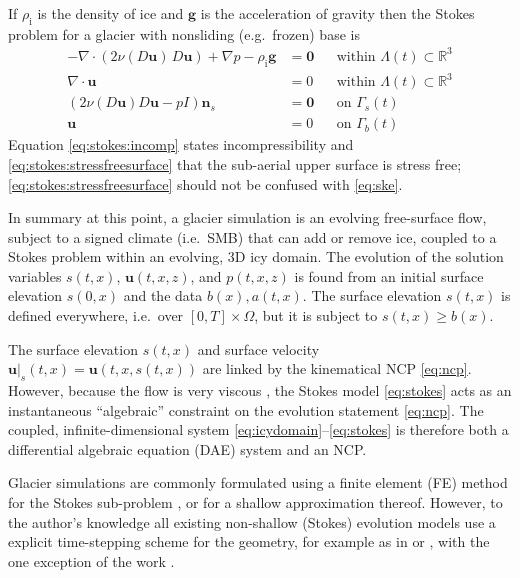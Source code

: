 \documentclass[hidelinks,onefignum,onetabnum,final]{siamart220329}  %
\newcommand{\RR}{\mathbb{R}}
\newcommand{\bg}{\mathbf{g}}
\newcommand{\bn}{\mathbf{n}}
\newcommand{\bu}{\mathbf{u}}
\newcommand{\bzero}{\bm{0}}
\newcommand{\rhoi}{\rho_{\text{i}}}
\begin{document}
If $\rhoi$ is the density of ice and $\bg$ is the acceleration of gravity then the Stokes problem for a glacier with nonsliding (e.g.~frozen) base \cite{JouvetRappaz2011} is
\begin{subequations}
\label{eq:stokes}
\begin{align}
- \nabla \cdot \left(2 \nu(D\bu)\, D\bu\right) + \nabla p - \rhoi \bg &= \bzero && \text{within $\Lambda(t) \subset \RR^3$} \\
\nabla \cdot \bu &= 0 && \text{within $\Lambda(t) \subset \RR^3$} \label{eq:stokes:incomp} \\
\left(2 \nu(D\bu) D\bu - pI\right) \bn_s &= \bzero && \text{on $\Gamma_s(t)$}\label{eq:stokes:stressfreesurface} \\
\bu  &= 0 && \text{on $\Gamma_b(t)$}
\end{align}
\end{subequations}
Equation \eqref{eq:stokes:incomp} states incompressibility and \eqref{eq:stokes:stressfreesurface} that the sub-aerial upper surface is stress free; \eqref{eq:stokes:stressfreesurface} should not be confused with \eqref{eq:ske}.

In summary at this point, a glacier simulation is an evolving free-surface flow, subject to a signed climate (i.e.~SMB) that can add or remove ice, coupled to a Stokes problem within an evolving, 3D icy domain.  The evolution of the solution variables $s(t,x)$, $\bu(t,x,z)$, and $p(t,x,z)$ is found from an initial surface elevation $s(0,x)$ and the data $b(x),a(t,x)$.  The surface elevation $s(t,x)$ is defined everywhere, i.e.~over $[0,T]\times \Omega$, but it is subject to $s(t,x) \ge b(x)$.

The surface elevation $s(t,x)$ and surface velocity $\bu|_s(t,x)=\bu(t,x,s(t,x))$ are linked by the kinematical NCP \eqref{eq:ncp}.  However, because the flow is very viscous \cite{Acheson1990}, the Stokes model \eqref{eq:stokes} acts as an instantaneous ``algebraic'' constraint on the evolution statement \eqref{eq:ncp}.  The coupled, infinite-dimensional system \eqref{eq:icydomain}--\eqref{eq:stokes} is therefore both a differential algebraic equation (DAE) system \cite{AscherPetzold1998} and an NCP.

Glacier simulations are commonly formulated using a finite element (FE) method for the Stokes sub-problem \cite{IsaacStadlerGhattas2015,Jouvetetal2008,Pattynetal2008}, or for a shallow approximation thereof.  However, to the author's knowledge all existing non-shallow (Stokes) evolution models use a explicit time-stepping scheme for the geometry, for example as in \cite{Jouvetetal2008} or \cite{LofgrenAhlkronaHelanow2022}, with the one exception of the work \cite{WirbelJarosch2020}.
\end{document}
